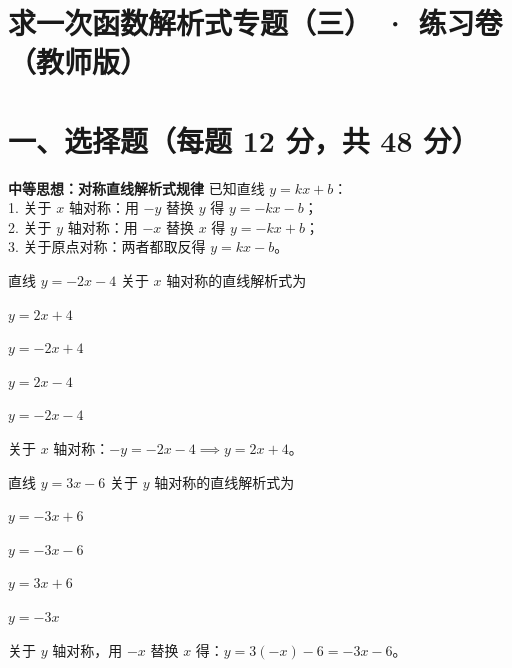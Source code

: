 \documentclass{exam-zh}
\begin{document}
\section*{求一次函数解析式专题（三） · 练习卷（教师版）}

\section*{一、选择题（每题 12 分，共 48 分）}


\begin{keyideabox}
  \textbf{中等思想：对称直线解析式规律}
  已知直线 $y=kx+b$：\\ 1. 关于 $x$ 轴对称：用 $-y$ 替换 $y$ 得 $y = -kx - b$；\\ 2. 关于 $y$ 轴对称：用 $-x$ 替换 $x$ 得 $y = -kx + b$；\\ 3. 关于原点对称：两者都取反得 $y = kx - b$。
\end{keyideabox}



\begin{question}[points=12]
  直线 $y = -2x - 4$ 关于 $x$ 轴对称的直线解析式为
  \begin{choices}
    \item $y = 2x + 4$
    \item $y = -2x + 4$
    \item $y = 2x - 4$
    \item $y = -2x - 4$
  \end{choices}
  \paren[A]
  \begin{solutionblock}
    关于 $x$ 轴对称：$-y = -2x - 4 \implies y = 2x + 4$。
  \end{solutionblock}
\end{question}



\begin{question}[points=12]
  直线 $y = 3x - 6$ 关于 $y$ 轴对称的直线解析式为
  \begin{choices}
    \item $y = -3x + 6$
    \item $y = -3x - 6$
    \item $y = 3x + 6$
    \item $y = -3x$
  \end{choices}
  \paren[B]
  \begin{solutionblock}
    关于 $y$ 轴对称，用 $-x$ 替换 $x$ 得：$y = 3(-x) - 6 = -3x - 6$。
  \end{solutionblock}
\end{question}
\end{document}
